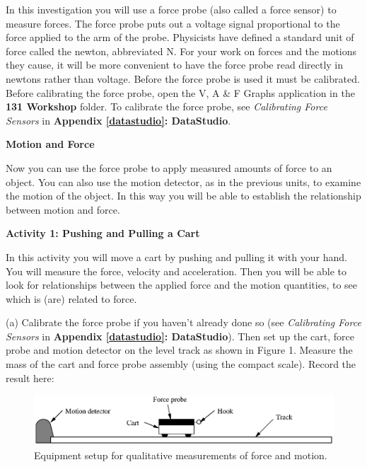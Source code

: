 In this investigation you will use a force probe (also called a force sensor) to measure forces. The force probe puts out a voltage signal proportional to the force applied to the arm of the probe. Physicists have defined a standard unit of force called the newton, abbreviated N. For your work on forces and the motions they cause, it will be more convenient to have the force probe read directly in newtons rather than voltage. Before the force probe is used it must be calibrated. Before calibrating the force probe, open the V, A \& F Graphs application in the \textbf{131 Workshop} folder. To calibrate the force probe, see \textit{Calibrating Force Sensors} in \textbf{Appendix \ref{datastudio}: DataStudio}.

\pagebreak[2]
\textbf{Motion and Force} 

Now you can use the force probe to apply measured amounts of force to an object.
You can also use the motion detector, as in the previous units, to examine the
motion of the object. In this way you will be able to establish the relationship
between motion and force.
\vspace{10mm}

\textbf{Activity 1: Pushing and Pulling a Cart} 

In this activity you will move a cart by pushing and pulling it with your hand.
You will measure the force, velocity and acceleration. Then you will be able
to look for relationships between the applied force and the motion quantities,
to see which is (are) related to force.

(a) Calibrate the force probe if you haven't already done so (see \textit{Calibrating Force Sensors} in \textbf{Appendix \ref{datastudio}: DataStudio}). Then set up the cart, force probe and motion detector on the level track as shown in Figure 1. Measure the mass of the cart and force probe assembly (using the compact scale). Record the result here:

\answerspace{15mm}

\begin{figure}[t]
{\par\centering \includegraphics{force1/force1_fig1.eps} \par}


\caption{Equipment setup for qualitative measurements of force and motion.}
\end{figure}


